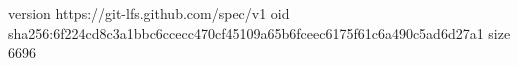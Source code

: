 version https://git-lfs.github.com/spec/v1
oid sha256:6f224cd8c3a1bbc6ccecc470cf45109a65b6fceec6175f61c6a490c5ad6d27a1
size 6696
